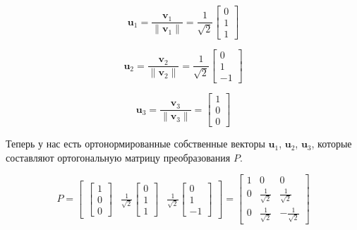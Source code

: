 \documentclass{article}
\begin{document}
\[
\mathbf{u}_1 = \frac{\mathbf{v}_1}{\|\mathbf{v}_1\|} = \frac{1}{\sqrt{2}}\begin{bmatrix} 0 \\ 1 \\ 1 \end{bmatrix}
\]

\[
\mathbf{u}_2 = \frac{\mathbf{v}_2}{\|\mathbf{v}_2\|} = \frac{1}{\sqrt{2}}\begin{bmatrix} 0 \\ 1 \\ -1 \end{bmatrix}
\]

\[
\mathbf{u}_3 = \frac{\mathbf{v}_3}{\|\mathbf{v}_3\|} = \begin{bmatrix} 1 \\ 0 \\ 0 \end{bmatrix}
\]

Теперь у нас есть ортонормированные собственные векторы \(\mathbf{u}_1\), \(\mathbf{u}_2\), \(\mathbf{u}_3\), которые составляют ортогональную матрицу преобразования \(P\).

\[
P = \begin{bmatrix}
 \begin{bmatrix} 1 \\ 0 \\ 0 \end{bmatrix} & \frac{1}{\sqrt{2}}\begin{bmatrix} 0 \\ 1 \\ 1 \end{bmatrix} & \frac{1}{\sqrt{2}}\begin{bmatrix} 0 \\ 1 \\ -1 \end{bmatrix} 
\end{bmatrix} = \begin{bmatrix}
1 & 0 & 0 \\
 0&\frac{1}{\sqrt{2}} & \frac{1}{\sqrt{2}}  \\
 0&\frac{1}{\sqrt{2}} & -\frac{1}{\sqrt{2}}
\end{bmatrix}
\]
\end{document}
